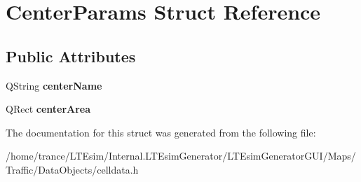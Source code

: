 \hypertarget{struct_center_params}{}\section{Center\+Params Struct Reference}
\label{struct_center_params}
\subsection*{Public Attributes}
\begin{DoxyCompactItemize}
\item 
Q\+String {\bfseries center\+Name}\hypertarget{struct_center_params_a8050ad435eb184a5caf881cc041dafb6}{}\label{struct_center_params_a8050ad435eb184a5caf881cc041dafb6}

\item 
Q\+Rect {\bfseries center\+Area}\hypertarget{struct_center_params_a1dbf7f75db4b194eb0be2f3699bcd477}{}\label{struct_center_params_a1dbf7f75db4b194eb0be2f3699bcd477}

\end{DoxyCompactItemize}


The documentation for this struct was generated from the following file\+:\begin{DoxyCompactItemize}
\item 
/home/trance/\+L\+T\+Esim/\+Internal.\+L\+T\+Esim\+Generator/\+L\+T\+Esim\+Generator\+G\+U\+I/\+Maps/\+Traffic/\+Data\+Objects/celldata.\+h\end{DoxyCompactItemize}
